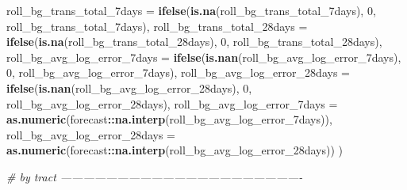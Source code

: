 \documentclass[]{book}
\newenvironment{Shaded}{\begin{snugshade}}{\end{snugshade}}
\newcommand{\KeywordTok}[1]{\textcolor[rgb]{0.13,0.29,0.53}{\textbf{#1}}}
\newcommand{\DataTypeTok}[1]{\textcolor[rgb]{0.13,0.29,0.53}{#1}}
\newcommand{\DecValTok}[1]{\textcolor[rgb]{0.00,0.00,0.81}{#1}}
\newcommand{\CommentTok}[1]{\textcolor[rgb]{0.56,0.35,0.01}{\textit{#1}}}
\newcommand{\OperatorTok}[1]{\textcolor[rgb]{0.81,0.36,0.00}{\textbf{#1}}}
\newcommand{\NormalTok}[1]{#1}
\theoremstyle{definition}
\theoremstyle{definition}
\theoremstyle{definition}
\theoremstyle{remark}
\begin{document}
\begin{Shaded}
\begin{Highlighting}[]
{{{{{{{{{{{    \DataTypeTok{roll_bg_trans_total_7days =} \KeywordTok{ifelse}\NormalTok{(}\KeywordTok{is.na}\NormalTok{(roll_bg_trans_total_7days), }
                                       \DecValTok{0}\NormalTok{, roll_bg_trans_total_7days),}
    \DataTypeTok{roll_bg_trans_total_28days =} \KeywordTok{ifelse}\NormalTok{(}\KeywordTok{is.na}\NormalTok{(roll_bg_trans_total_28days), }
                                        \DecValTok{0}\NormalTok{, roll_bg_trans_total_28days),}
    \DataTypeTok{roll_bg_avg_log_error_7days =} \KeywordTok{ifelse}\NormalTok{(}\KeywordTok{is.nan}\NormalTok{(roll_bg_avg_log_error_7days), }
                                         \DecValTok{0}\NormalTok{, roll_bg_avg_log_error_7days),}
    \DataTypeTok{roll_bg_avg_log_error_28days =} \KeywordTok{ifelse}\NormalTok{(}\KeywordTok{is.nan}\NormalTok{(roll_bg_avg_log_error_28days), }
                                          \DecValTok{0}\NormalTok{, roll_bg_avg_log_error_28days),}
    \DataTypeTok{roll_bg_avg_log_error_7days =} \KeywordTok{as.numeric}\NormalTok{(forecast}\OperatorTok{::}\KeywordTok{na.interp}\NormalTok{(roll_bg_avg_log_error_7days)),}
    \DataTypeTok{roll_bg_avg_log_error_28days =} \KeywordTok{as.numeric}\NormalTok{(forecast}\OperatorTok{::}\KeywordTok{na.interp}\NormalTok{(roll_bg_avg_log_error_28days))}
\NormalTok{  )}

\CommentTok{# by tract ----------------------------------------------------------------}

}}}}}}}}}}}
\end{Highlighting}
\end{Shaded}
\end{document}
